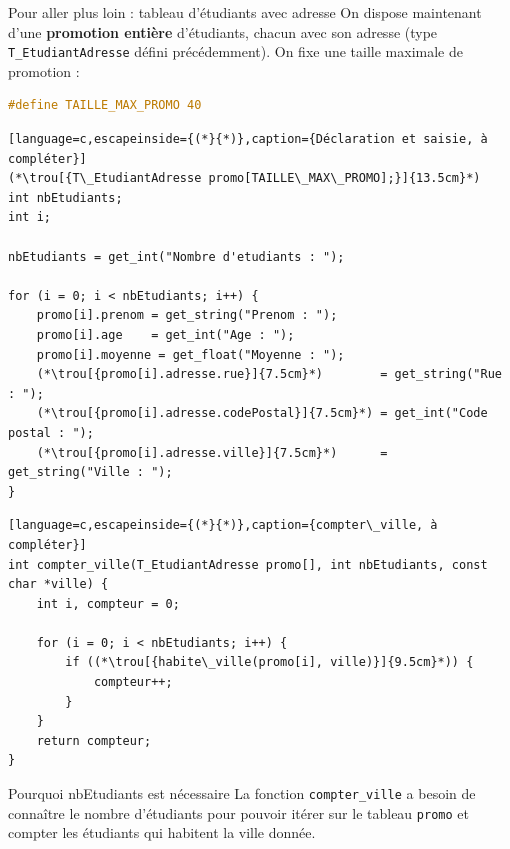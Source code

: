
\begin{UPSTIexercice}{Pour aller plus loin : tableau d'étudiants avec adresse}
    On dispose maintenant d'une \textbf{promotion entière} d'étudiants, chacun avec son adresse
    (type \texttt{T\_EtudiantAdresse} défini précédemment). On fixe une taille maximale de promotion :
    \begin{lstlisting}[language=C]
#define TAILLE_MAX_PROMO 40
\end{lstlisting}


    \begin{lstlisting}[language=c,escapeinside={(*}{*)},caption={Déclaration et saisie, à compléter}]
(*\trou[{T\_EtudiantAdresse promo[TAILLE\_MAX\_PROMO];}]{13.5cm}*)
int nbEtudiants;
int i;

nbEtudiants = get_int("Nombre d'etudiants : ");

for (i = 0; i < nbEtudiants; i++) {
    promo[i].prenom = get_string("Prenom : ");
    promo[i].age    = get_int("Age : ");
    promo[i].moyenne = get_float("Moyenne : ");
    (*\trou[{promo[i].adresse.rue}]{7.5cm}*)        = get_string("Rue : ");
    (*\trou[{promo[i].adresse.codePostal}]{7.5cm}*) = get_int("Code postal : ");
    (*\trou[{promo[i].adresse.ville}]{7.5cm}*)      = get_string("Ville : ");
}
\end{lstlisting}


    \begin{lstlisting}[language=c,escapeinside={(*}{*)},caption={compter\_ville, à compléter}]
int compter_ville(T_EtudiantAdresse promo[], int nbEtudiants, const char *ville) {
    int i, compteur = 0;

    for (i = 0; i < nbEtudiants; i++) {
        if ((*\trou[{habite\_ville(promo[i], ville)}]{9.5cm}*)) {
            compteur++;
        }
    }
    return compteur;
}
\end{lstlisting}

    \begin{UPSTIeleveOnlyEnv}
    \end{UPSTIeleveOnlyEnv}
    \begin{UPSTIcorrectionP}{Pourquoi nbEtudiants est nécessaire}
        La fonction \texttt{compter\_ville} a besoin de connaître le nombre d'étudiants pour pouvoir itérer sur le tableau \texttt{promo} et compter les étudiants qui habitent la ville donnée.
    \end{UPSTIcorrectionP}
\end{UPSTIexercice}

